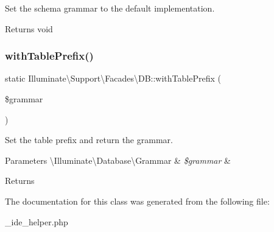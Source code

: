 Set the schema grammar to the default implementation.

\begin{DoxyReturn}{Returns}
void 
\end{DoxyReturn}
\mbox{\label{class_illuminate_1_1_support_1_1_facades_1_1_d_b_a6f0a757193d06d182a275d5db6508f5e}} 
\subsubsection{\texorpdfstring{with\+Table\+Prefix()}{withTablePrefix()}}
{\footnotesize\ttfamily static Illuminate\textbackslash{}\+Support\textbackslash{}\+Facades\textbackslash{}\+D\+B\+::with\+Table\+Prefix (\begin{DoxyParamCaption}\item[{}]{\$grammar }\end{DoxyParamCaption})\hspace{0.3cm}{\ttfamily [static]}}

Set the table prefix and return the grammar.


\begin{DoxyParams}[1]{Parameters}
\textbackslash{}\+Illuminate\textbackslash{}\+Database\textbackslash{}\+Grammar & {\em \$grammar} & \\
\hline
\end{DoxyParams}
\begin{DoxyReturn}{Returns}

\end{DoxyReturn}


The documentation for this class was generated from the following file\+:\begin{DoxyCompactItemize}
\item 
\+\_\+ide\+\_\+helper.\+php\end{DoxyCompactItemize}
